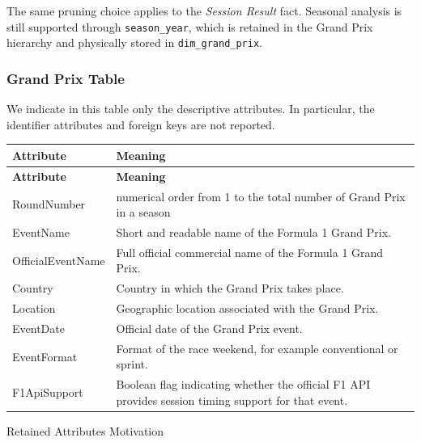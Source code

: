\documentclass[a4paper,11pt]{article}
\begin{document}
	The same pruning choice applies to the \textit{Session Result} fact. Seasonal analysis is
	still supported through \texttt{season\_year}, which is retained in the Grand Prix hierarchy
	and physically stored in \texttt{dim\_grand\_prix}.

	
	
	\subsubsection{Grand Prix Table}
	
	We indicate in this table only the descriptive attributes. In particular, the identifier attributes and foreign keys are not reported.
	
	\begin{longtable}{|p{4cm}|p{10.8cm}|}
		\hline
		\textbf{Attribute} & \textbf{Meaning} \\
		\hline
		\endfirsthead
		
		\hline
		\textbf{Attribute} & \textbf{Meaning} \\
		\hline
		\endhead
		RoundNumber & numerical order from 1 to the total number of Grand Prix in a season \\ \hline
		
		EventName & Short and readable name of the Formula 1 Grand Prix. \\ \hline
		
		OfficialEventName & Full official commercial name of the Formula 1 Grand Prix. \\ \hline
		
		Country & Country in which the Grand Prix takes place. \\ \hline
		
		Location & Geographic location associated with the Grand Prix. \\ \hline
		
		EventDate & Official date of the Grand Prix event. \\ \hline
		
		EventFormat & Format of the race weekend, for example conventional or sprint. \\ \hline
		
		F1ApiSupport & Boolean flag indicating whether the official F1 API provides session timing support for that event. \\ \hline
		
	\end{longtable}
	
	
	Retained Attributes Motivation
	
\end{document}
